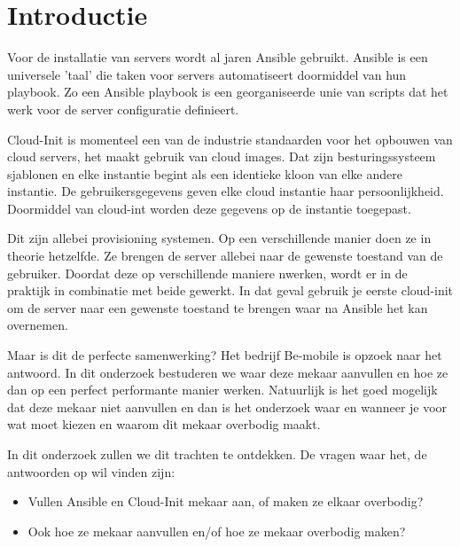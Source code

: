 
\section{Introductie} %
\label{sec:introductie}

Voor de installatie van servers wordt al jaren Ansible gebruikt. Ansible is een universele 'taal' die taken voor servers automatiseert doormiddel van hun playbook. Zo een Ansible playbook is een georganiseerde unie van scripts dat het werk voor de server configuratie definieert.

Cloud-Init is momenteel een van de industrie standaarden voor het opbouwen van cloud servers, het maakt gebruik van cloud images. Dat zijn besturingssysteem sjablonen en elke instantie begint als een identieke kloon van elke andere instantie. De gebruikersgegevens geven elke cloud instantie haar persoonlijkheid. Doormiddel van cloud-int worden deze gegevens op de instantie toegepast. 

Dit zijn allebei provisioning systemen. Op een verschillende manier doen ze in theorie hetzelfde. Ze brengen de server allebei naar de gewenste toestand van de gebruiker. Doordat deze op verschillende maniere nwerken, wordt er in de praktijk in combinatie met beide gewerkt. In dat geval gebruik je eerste cloud-init om de server naar een gewenste toestand te brengen waar na Ansible het kan overnemen.

Maar is dit de perfecte samenwerking? Het bedrijf Be-mobile is opzoek naar het antwoord. In dit onderzoek bestuderen we waar deze mekaar aanvullen en hoe ze dan op een perfect performante manier werken. Natuurlijk is het goed mogelijk dat deze mekaar niet aanvullen en dan is het onderzoek waar en wanneer je voor wat moet kiezen en waarom dit mekaar overbodig maakt. 

In dit onderzoek zullen we dit trachten te ontdekken. De vragen waar het, de antwoorden op wil vinden zijn:
\begin{itemize}
	\item Vullen Ansible en Cloud-Init mekaar aan, of maken ze elkaar overbodig?
	\item Ook hoe ze mekaar aanvullen en/of hoe ze mekaar overbodig maken?
\end{itemize}

